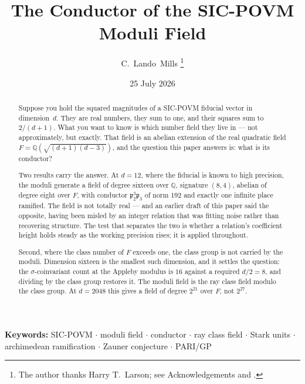 \documentclass[12pt,a4paper]{article}
\newcommand{\Fd}{F}
\newcommand{\pt}{\mathfrak{p}_2}
\begin{document}
\title{\textbf{The Conductor of the SIC-POVM Moduli Field}}

\author{C.\ Lando\ Mills%
\thanks{The author thanks Harry T.\ Larson; see Acknowledgements and \cite{Larson1961}.}}

\date{25 July 2026}

\maketitle

\begin{abstract}
Suppose you hold the squared magnitudes of a SIC-POVM fiducial vector in dimension~$d$. They are real numbers, they sum to one, and their squares sum to $2/(d+1)$. What you want to know is which number field they live in — not approximately, but exactly. That field is an abelian extension of the real quadratic field $\Fd = \mathbb{Q}(\sqrt{(d+1)(d-3)})$, and the question this paper answers is: what is its conductor?

Two results carry the answer. At $d=12$, where the fiducial is known to high precision, the moduli generate a field of degree sixteen over $\mathbb{Q}$, signature $(8,4)$, abelian of degree eight over $\Fd$, with conductor $\pt^3\mathfrak{p}_3$ of norm $192$ and exactly one infinite place ramified. The field is not totally real — and an earlier draft of this paper said the opposite, having been misled by an integer relation that was fitting noise rather than recovering structure. The test that separates the two is whether a relation's coefficient height holds steady as the working precision rises; it is applied throughout.

Second, where the class number of $\Fd$ exceeds one, the class group is not carried by the moduli. Dimension sixteen is the smallest such dimension, and it settles the question: the $\sigma$-coinvariant count at the Appleby modulus is $16$ against a required $d/2 = 8$, and dividing by the class group restores it. The moduli field is the ray class field modulo the class group. At $d=2048$ this gives a field of degree $2^{21}$ over $\Fd$, not $2^{27}$.
\end{abstract}

\noindent\textbf{Keywords:} SIC-POVM \(\cdot\) moduli field \(\cdot\) conductor
\(\cdot\) ray class field \(\cdot\) Stark units \(\cdot\) archimedean ramification
\(\cdot\) Zauner conjecture \(\cdot\) PARI/GP

\newpage
\tableofcontents
\newpage

\end{document}
